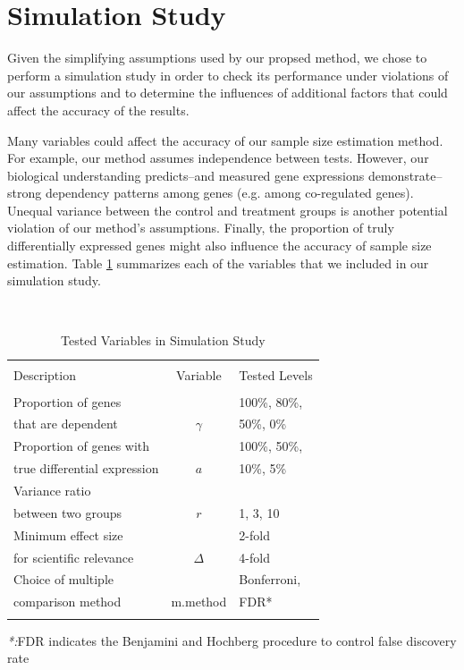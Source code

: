 \documentclass{bioinfo}
\begin{document}
\section{Simulation Study}

Given the simplifying assumptions used by our propsed method, we
chose to perform a simulation study in order to check its
performance under violations of our assumptions and to determine the
influences of additional factors that could affect the accuracy of
the results.

Many variables could affect the accuracy of our sample size
estimation method. For example, our method assumes independence
between tests. However, our biological understanding predicts--and
measured gene expressions demonstrate--strong dependency patterns
among genes (e.g. among co-regulated genes).  Unequal variance
between the control and treatment groups is another potential
violation of our method's assumptions. Finally, the proportion of
truly differentially expressed genes might also influence the
accuracy of sample size estimation.  Table
\ref{tb:SimuVariables} summarizes each of the variables that we
included in our simulation study.

\begin{table}\centering
  \caption{Tested Variables in Simulation Study}\ \\
  \begin{tabular}{lcl}
    \hline\hline
    \\
    Description & Variable & Tested Levels \\
    \\
    \hline\hline
    Proportion of genes &          & 100\%, 80\%,  \\
    that are dependent  & $\gamma$ & 50\%,   0\%    \\
    \hline
    Proportion of genes with     &     &  100\%, 50\%,\\
    true differential expression & $a$ &   10\%,  5\% \\
    \hline
    Variance ratio &  &\\
    between two groups & $r$ & 1, 3, 10  \\
    \hline
    Minimum effect size  & &2-fold \\
    for scientific relevance & $\Delta$ & 4-fold \\
    \hline
    Choice of multiple  & & Bonferroni,  \\
    comparison method & m.method & FDR* \\
    \hline\hline\\
  \end{tabular}
  \emph{*:}FDR indicates the Benjamini and Hochberg procedure to
    control false discovery rate
  \label{tb:SimuVariables}
\end{table}
\end{document}
